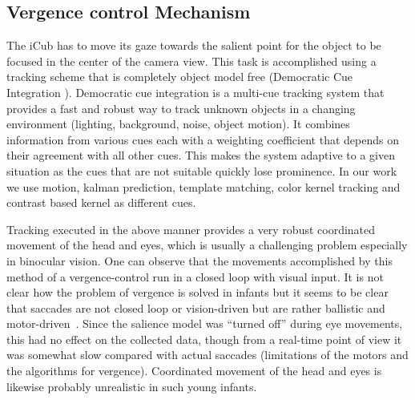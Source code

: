 \documentclass[conference]{IEEEtran}
\begin{document}
\subsection{Vergence control Mechanism}
The iCub has to move its gaze towards the salient point for the object
to be focused in the center of the camera view. This task is
accomplished using a tracking scheme that is completely object model
free (Democratic Cue Integration \cite{triesch2001}). Democratic cue
integration is a multi-cue tracking system that provides a fast and
robust way to track unknown objects in a changing environment
(lighting, background, noise, object motion). It combines information
from various cues each with a weighting coefficient that depends on
their agreement with all other cues. This makes the system adaptive to
a given situation as the cues that are not suitable quickly lose
prominence. In our work we use motion, kalman prediction, template
matching, color kernel tracking and contrast based kernel as different
cues.

Tracking executed in the above manner provides a very robust
coordinated movement of the head and eyes, which is usually a
challenging problem especially in binocular vision. One can observe
that the movements accomplished by this method of a vergence-control
run in a closed loop with visual input. It is not clear how the
problem of vergence is solved in infants but it seems to be clear that
saccades are not closed loop or vision-driven but are rather ballistic
and motor-driven~\cite{hainline_1998}. Since the salience model was
``turned off'' during eye movements, this had no effect on the
collected data, though from a real-time point of view it was somewhat
slow compared with actual saccades (limitations of the motors and the
algorithms for vergence). Coordinated movement of the head and eyes is
likewise probably unrealistic in such young infants.
\end{document}
